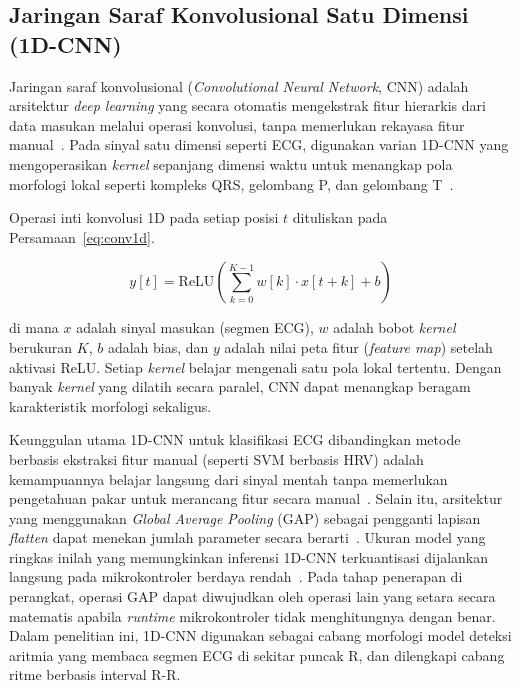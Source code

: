 \subsection{Jaringan Saraf Konvolusional Satu Dimensi (1D-CNN)}

Jaringan saraf konvolusional (\textit{Convolutional Neural Network}, CNN)
adalah arsitektur \textit{deep learning} yang secara otomatis mengekstrak fitur
hierarkis dari data masukan melalui operasi konvolusi, tanpa memerlukan
rekayasa fitur manual~\cite{kim_2023}. Pada sinyal satu dimensi seperti ECG,
digunakan varian 1D-CNN yang mengoperasikan \textit{kernel} sepanjang dimensi
waktu untuk menangkap pola morfologi lokal seperti kompleks QRS, gelombang P,
dan gelombang T~\cite{kiranyaz_2021}.

Operasi inti konvolusi 1D pada setiap posisi $t$ dituliskan pada Persamaan~\ref{eq:conv1d}.

\begin{equation}
\label{eq:conv1d}
y[t] = \text{ReLU}\!\left(\sum_{k=0}^{K-1} w[k] \cdot x[t+k] + b\right)
\end{equation}

di mana $x$ adalah sinyal masukan (segmen ECG), $w$ adalah bobot
\textit{kernel} berukuran $K$, $b$ adalah bias, dan $y$ adalah nilai peta
fitur (\textit{feature map}) setelah aktivasi ReLU. Setiap \textit{kernel}
belajar mengenali satu pola lokal tertentu. Dengan banyak \textit{kernel}
yang dilatih secara paralel, CNN dapat menangkap beragam karakteristik
morfologi sekaligus.

Keunggulan utama 1D-CNN untuk klasifikasi ECG dibandingkan metode
berbasis ekstraksi fitur manual (seperti SVM berbasis HRV) adalah
kemampuannya belajar langsung dari sinyal mentah tanpa memerlukan pengetahuan
pakar untuk merancang fitur secara manual~\cite{mekhfioui_2025}. Selain itu, arsitektur yang menggunakan \textit{Global Average Pooling} (GAP) sebagai pengganti
lapisan \textit{flatten} dapat menekan jumlah parameter secara berarti~\cite{mekhfioui_2025}.
Ukuran model yang ringkas inilah yang
memungkinkan inferensi 1D-CNN terkuantisasi dijalankan langsung pada mikrokontroler
berdaya rendah~\cite{kim_2023}. Pada tahap penerapan di perangkat, operasi GAP dapat
diwujudkan oleh operasi lain yang setara secara matematis apabila \textit{runtime}
mikrokontroler tidak menghitungnya dengan benar. Dalam penelitian ini, 1D-CNN digunakan sebagai
cabang morfologi model deteksi aritmia yang membaca segmen ECG di sekitar puncak R,
dan dilengkapi cabang ritme berbasis interval R-R.

